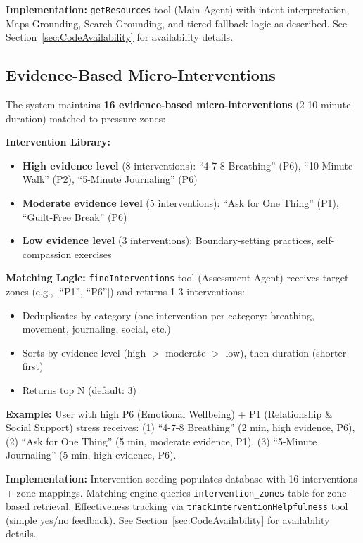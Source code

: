 \documentclass{article}
\begin{document}
\textbf{Implementation:} \texttt{getResources} tool (Main Agent) with intent interpretation, Maps Grounding, Search Grounding, and tiered fallback logic as described. See Section~\ref{sec:CodeAvailability} for availability details.

%
\subsection{Evidence-Based Micro-Interventions}%
\label{subsec:MicroInterventions}%
The system maintains \textbf{16 evidence-based micro-interventions} (2-10 minute duration) matched to pressure zones:

\textbf{Intervention Library:}
\begin{itemize}
    \item \textbf{High evidence level} (8 interventions): ``4-7-8 Breathing'' (P6), ``10-Minute Walk'' (P2), ``5-Minute Journaling'' (P6)
    \item \textbf{Moderate evidence level} (5 interventions): ``Ask for One Thing'' (P1), ``Guilt-Free Break'' (P6)
    \item \textbf{Low evidence level} (3 interventions): Boundary-setting practices, self-compassion exercises
\end{itemize}

\textbf{Matching Logic:} \texttt{findInterventions} tool (Assessment Agent) receives target zones (e.g., [``P1'', ``P6'']) and returns 1-3 interventions:
\begin{itemize}
    \item Deduplicates by category (one intervention per category: breathing, movement, journaling, social, etc.)
    \item Sorts by evidence level (high $>$ moderate $>$ low), then duration (shorter first)
    \item Returns top N (default: 3)
\end{itemize}

\textbf{Example:} User with high P6 (Emotional Wellbeing) + P1 (Relationship \& Social Support) stress receives: (1) ``4-7-8 Breathing'' (2 min, high evidence, P6), (2) ``Ask for One Thing'' (5 min, moderate evidence, P1), (3) ``5-Minute Journaling'' (5 min, high evidence, P6).

\textbf{Implementation:} Intervention seeding populates database with 16 interventions + zone mappings. Matching engine queries \texttt{intervention\_zones} table for zone-based retrieval. Effectiveness tracking via \texttt{trackInterventionHelpfulness} tool (simple yes/no feedback). See Section~\ref{sec:CodeAvailability} for availability details.
\end{document}
